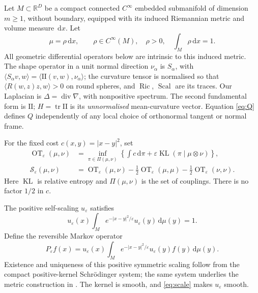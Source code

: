 \documentclass[11pt,a4paper]{article}
\theoremstyle{definition}\newtheorem{definition}[theorem]{Definition}
\theoremstyle{remark}\newtheorem{remark}[theorem]{Remark}
\newcommand{\eps}{\varepsilon}
\newcommand{\dd}{\,\mathrm d}
\newcommand{\R}{\mathbb R}
\newcommand{\diver}{\operatorname{div}}
\newcommand{\tr}{\operatorname{tr}}
\newcommand{\KL}{\operatorname{KL}}
\newcommand{\OT}{\operatorname{OT}}
\newcommand{\II}{\mathrm{II}}
\newcommand{\Ric}{\operatorname{Ric}}
\newcommand{\Scal}{\operatorname{Scal}}
\newcommand{\SD}{\mathcal S}
\begin{document}
Let $M\subset\R^D$ be a compact connected $C^\infty$ embedded submanifold of dimension $m\geq1$, without boundary, equipped with its induced Riemannian metric and volume measure $\dd x$. Let
\[
\mu=\rho\dd x,\qquad \rho\in C^\infty(M),\quad \rho>0,\quad \int_M\rho\dd x=1.
\]
All geometric differential operators below are intrinsic to this induced metric. The shape operator in a unit normal direction $\nu_\alpha$ is $S_\alpha$, with $\langle S_\alpha v,w\rangle=\langle\II(v,w),\nu_\alpha\rangle$; the curvature tensor is normalised so that $\langle R(w,z)z,w\rangle>0$ on round spheres, and $\Ric$, $\Scal$ are its traces. Our Laplacian is $\Delta=\diver\nabla$, with nonpositive spectrum. The second fundamental form is $\II$; $H=\tr\II$ is its \emph{unnormalised} mean-curvature vector. Equation \eqref{eq:Q} defines $Q$ independently of any local choice of orthonormal tangent or normal frame.

For the fixed cost $c(x,y)=|x-y|^2$, set
\begin{align}
\OT_\eps(\mu,\nu)&=\inf_{\pi\in\Pi(\mu,\nu)}\left\{\int c\dd\pi+\eps\KL(\pi\mid\mu\otimes\nu)\right\},\\
\SD_\eps(\mu,\nu)&=\OT_\eps(\mu,\nu)-\tfrac12\OT_\eps(\mu,\mu)-\tfrac12\OT_\eps(\nu,\nu).
\end{align}
Here $\KL$ is relative entropy and $\Pi(\mu,\nu)$ is the set of couplings. There is no factor $1/2$ in $c$.

The positive self-scaling $u_\eps$ satisfies
\begin{equation}\label{eq:scale}
u_\eps(x)\int_M e^{-|x-y|^2/\eps}u_\eps(y)\dd\mu(y)=1.
\end{equation}
Define the reversible Markov operator
\begin{equation}\label{eq:P}
P_\eps f(x)=u_\eps(x)\int_M e^{-|x-y|^2/\eps}u_\eps(y)f(y)\dd\mu(y).
\end{equation}
Existence and uniqueness of this positive symmetric scaling follow from the compact positive-kernel Schr\"odinger system; the same system underlies the metric construction in \cite{LLMST}. The kernel is smooth, and \eqref{eq:scale} makes $u_\eps$ smooth.
\end{document}
